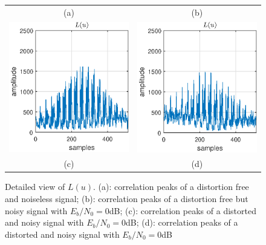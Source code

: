 \begin{figure}
\begin{center}
\begin{tabular}{cc}
			\quad\quad\quad\quad(a)
			&
			\quad\quad\quad\quad(b) \\[12pt]
			
			\begin{minipage}[c]{3in}
				\includegraphics[width=3in]{figures/gpu/L_corr_17_creepy.eps}
			\end{minipage} 
			&  
			\begin{minipage}[c]{3in}
				\includegraphics[width=3in]{figures/gpu/L_corr_18_creepy.eps}
			\end{minipage} \\[12pt]
			
			\quad\quad\quad\quad(c)
			&
			\quad\quad\quad\quad(d)
			
		\end{tabular}
	\end{center}
	\caption{Detailed view of $L(u)$. 
			(a): correlation peaks of a distortion free and noiseless signal; 
			(b): correlation peaks of a distortion free but noisy signal with $E_b/N_0 = 0$dB; 
			(c): correlation peaks of a distorted and noisy signal with $E_b/N_0 = 0$dB;
			(d): correlation peaks of a distorted and noisy signal with $E_b/N_0 = 0$dB}
	\label{fig:L_corr_creepy}
\end{figure}

